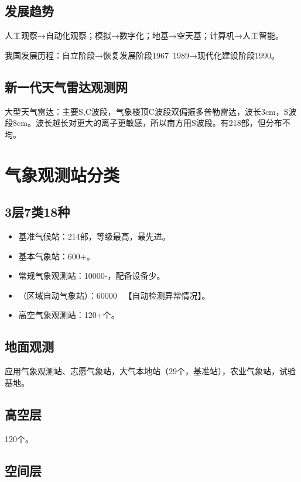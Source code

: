 \documentclass[UTF8,11pt]{ctexbook}
\begin{document}
\subsection{发展趋势}

人工观察→自动化观察；模拟→数字化；地基→空天基；计算机→人工智能。

我国发展历程：自立阶段→恢复发展阶段1967~1989→现代化建设阶段1990。

\subsection{新一代天气雷达观测网}

大型天气雷达：主要S,C波段，气象楼顶C波段双偏振多普勒雷达，波长3cm，S波段8cm。波长越长对更大的离子更敏感，所以南方用S波段。有218部，但分布不均。

\section{气象观测站分类}

\subsection{3层7类18种}
\begin{itemize}
    \item 基准气候站：214部，等级最高，最先进。
    \item 基本气象站：600+。
    \item 常规气象观测站：10000-，配备设备少。
    \item （区域自动气象站）：60000~ 【自动检测异常情况】。
    \item 高空气象观测站：120+个。
\end{itemize}

\subsection{地面观测}

应用气象观测站、志愿气象站，大气本地站（29个，基准站），农业气象站，试验基地。

\subsection{高空层}

120个。

\subsection{空间层}
\end{document}
